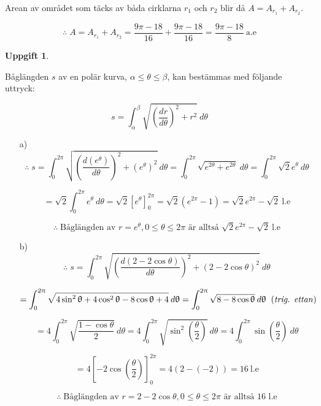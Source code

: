 \documentclass{article}
\newtheorem{thr}{Uppgift}
\begin{document}
\begin{enumerate}
        Arean av området som täcks av båda cirklarna $r_{1}$ och $r_{2}$ blir då $A=A_{r_{1}}+A_{r_{2}}$.

        $$
        \therefore
        \;
        A
        =
        A_{r_{1}}+A_{r_{2}}
        =
        \frac{9\pi-18}{16}+\frac{9\pi-18}{16}
        =
        \frac{9\pi-18}{8} \: \text{a.e}
        $$

\end{enumerate}

\newpage

\begin{thr}
\end{thr}

Båglängden $s$ av en polär kurva, $\alpha\leq\theta\leq\beta$, kan bestämmas med följande uttryck:

$$
s
=
\int_{\alpha}^{\beta} \sqrt{(\frac{dr}{d\theta})^2+r^2} \: d\theta
$$

\vskip 0.5cm

\begin{enumerate}
    \item[a)] 
        $$
        \therefore
        \;
        s
        =
        \int_{0}^{2\pi} \sqrt{(\frac{d(e^{\theta})}{d\theta})^2+(e^{\theta})^2} \: d\theta
        =
        \int_{0}^{2\pi} \sqrt{e^{2\theta}+e^{2\theta}} \: d\theta
        =
        \int_{0}^{2\pi} \sqrt{2}e^{\theta} \: d\theta
        $$

        $$
        =
        \sqrt{2}
        \int_{0}^{2\pi} e^{\theta} \: d\theta
        =
        \sqrt{2}
        \left[e^\theta \right]_{0}^{2\pi}
        =
        \sqrt{2}
        (e^{2\pi} - 1)
        =
        \sqrt{2}e^{2\pi}-\sqrt{2} \: \text{l.e}
        $$

        $$
        \therefore
        \;
        \text{Båglängden av $r=e^{\theta}, 0\leq\theta\leq2\pi$ är alltså $\sqrt{2}e^{2\pi}-\sqrt{2} \: \text{l.e}$}
        $$

    \item[b)]
        $$
        \therefore
        \;
        s
        =
        \int_{0}^{2\pi} \sqrt{(\frac{d(2-2\cos\theta)}{d\theta})^2+(2-2\cos\theta)^2} \: d\theta
        $$

        $$
        =
        \int_{0}^{2\pi} \sqrt{4\sin^2\theta+4\cos^2\theta-8\cos\theta+4} \: d\theta
        =
        \int_{0}^{2\pi} \sqrt{8-8\cos\theta} \: d\theta
        \;\;
        \text{(\emph{trig. ettan})}
        $$

        $$
        = 
        4
        \int_{0}^{2\pi} \sqrt{\frac{1-\cos\theta}{2}} \: d\theta
        =
        4
        \int_{0}^{2\pi} \sqrt{\sin^2(\frac{\theta}{2})} \: d\theta
        =
        4
        \int_{0}^{2\pi} \sin(\frac{\theta}{2}) \: d\theta
        $$

        $$
        =
        4
        \left[-2\cos(\frac{\theta}{2}) \right]_{0}^{2\pi}
        =
        4
        (2-(-2))
        =
        16 \: \text{l.e}
        $$

        $$
        \therefore
        \;
        \text{Båglängden av $r=2-2\cos\theta, 0\leq\theta\leq2\pi$ är alltså 16 l.e}
        $$

\end{enumerate}
\end{document}
